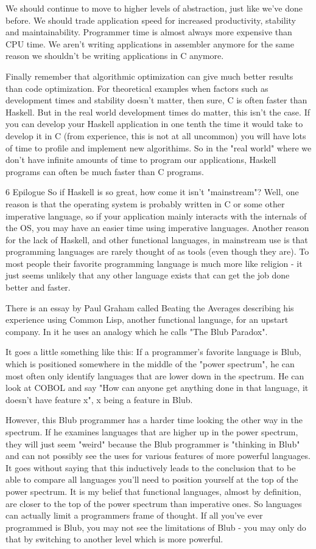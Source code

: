 \documentclass{report}
\begin{document}
We should continue to move to higher levels of abstraction, just like we've done before. We should trade application speed for increased productivity, stability and maintainability. Programmer time is almost always more expensive than CPU time. We aren't writing applications in assembler anymore for the same reason we shouldn't be writing applications in C anymore.

Finally remember that algorithmic optimization can give much better results than code optimization. For theoretical examples when factors such as development times and stability doesn't matter, then sure, C is often faster than Haskell. But in the real world development times do matter, this isn't the case. If you can develop your Haskell application in one tenth the time it would take to develop it in C (from experience, this is not at all uncommon) you will have lots of time to profile and implement new algorithims. So in the "real world" where we don't have infinite amounts of time to program our applications, Haskell programs can often be much faster than C programs.

6 Epilogue
So if Haskell is so great, how come it isn't "mainstream"? Well, one reason is that the operating system is probably written in C or some other imperative language, so if your application mainly interacts with the internals of the OS, you may have an easier time using imperative languages. Another reason for the lack of Haskell, and other functional languages, in mainstream use is that programming languages are rarely thought of as tools (even though they are). To most people their favorite programming language is much more like religion - it just seems unlikely that any other language exists that can get the job done better and faster.

There is an essay by Paul Graham called Beating the Averages describing his experience using Common Lisp, another functional language, for an upstart company. In it he uses an analogy which he calls "The Blub Paradox".

It goes a little something like this: If a programmer's favorite language is Blub, which is positioned somewhere in the middle of the "power spectrum", he can most often only identify languages that are lower down in the spectrum. He can look at COBOL and say "How can anyone get anything done in that language, it doesn't have feature x", x being a feature in Blub.

However, this Blub programmer has a harder time looking the other way in the spectrum. If he examines languages that are higher up in the power spectrum, they will just seem "weird" because the Blub programmer is "thinking in Blub" and can not possibly see the uses for various features of more powerful languages. It goes without saying that this inductively leads to the conclusion that to be able to compare all languages you'll need to position yourself at the top of the power spectrum. It is my belief that functional languages, almost by definition, are closer to the top of the power spectrum than imperative ones. So languages can actually limit a programmers frame of thought. If all you've ever programmed is Blub, you may not see the limitations of Blub - you may only do that by switching to another level which is more powerful.
\end{document}

